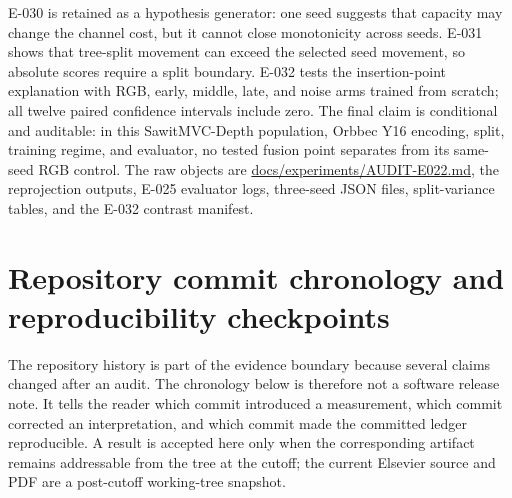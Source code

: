 \documentclass[preprint,12pt]{elsarticle}
\newcommand{\pathcode}[1]{\scriptsize\url{#1}}
\begin{document}
E-030 is retained as a hypothesis generator: one seed suggests that capacity
may change the channel cost, but it cannot close monotonicity across seeds.
E-031 shows that tree-split movement can exceed the selected seed movement,
so absolute scores require a split boundary. E-032 tests the insertion-point
explanation with RGB, early, middle, late, and noise arms trained from
scratch; all twelve paired confidence intervals include zero. The final claim
is conditional and auditable: in this SawitMVC-Depth population, Orbbec Y16
encoding, split, training regime, and evaluator, no tested fusion point
separates from its same-seed RGB control. The raw objects are
\pathcode{docs/experiments/AUDIT-E022.md}, the reprojection outputs, E-025 evaluator logs,
three-seed JSON files, split-variance tables, and the E-032 contrast manifest.

\section{Repository commit chronology and reproducibility checkpoints}
\label{app:commit-chronology}
The repository history is part of the evidence boundary because several claims
changed after an audit. The chronology below is therefore not a software
release note. It tells the reader which commit introduced a measurement,
which commit corrected an interpretation, and which commit made the committed
ledger reproducible. A result is accepted here only when the corresponding
artifact remains addressable from the tree at the cutoff; the current Elsevier
source and PDF are a post-cutoff working-tree snapshot.
\end{document}

